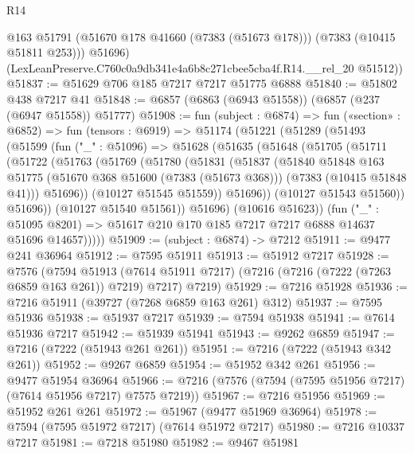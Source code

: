 \begin{lexlean}{R14}
\begin{coremodule}
          @163
          @51791
          (@51670 @178 @41660 (@7383 (@51673 @178)))
          (@7383 (@10415 @51811 @253)))
        @51696)
      (LexLeanPreserve.C760c0a9db341e4a6b8c271cbee5cba4f.R14.__rel_20 @51512))
@51837 := @51629 @706 @185 @7217 @7217 @51775 @6888
@51840 := @51802 @438 @7217 @41
@51848 := @6857 (@6863 (@6943 @51558)) (@6857 (@237 (@6947 @51558)) @51777)
@51908 := fun (subject : @6874) =>
  fun («section» : @6852) =>
  fun (tensors : @6919) =>
  @51174
    (@51221
      (@51289
        (@51493
          (@51599
            (fun ("_" : @51096) =>
            @51628
              (@51635
                (@51648
                  (@51705
                    (@51711
                      (@51722
                        (@51763
                          (@51769
                            (@51780
                              (@51831
                                (@51837
                                  (@51840
                                    @51848
                                    @163
                                    @51775
                                    (@51670 @368 @51600 (@7383 (@51673 @368)))
                                    (@7383 (@10415 @51848 @41)))
                                  @51696))
                              (@10127 @51545 @51559))
                            @51696))
                        (@10127 @51543 @51560))
                      @51696))
                  (@10127 @51540 @51561))
                @51696)
              (@10616 @51623))
            (fun ("_" : @51095 @8201) =>
            @51617 @210 @170 @185 @7217 @7217 @6888 @14637 @51696 @14657)))))
@51909 := (subject : @6874) -> @7212
@51911 := @9477 @241 @36964
@51912 := @7595 @51911
@51913 := @51912 @7217
@51928 := @7576
    (@7594
      @51913
      (@7614 @51911 @7217)
      (@7216 (@7216 (@7222 (@7263 @6859 @163 @261)) @7219) @7217)
      @7219)
@51929 := @7216 @51928
@51936 := @7216 @51911 (@39727 (@7268 @6859 @163 @261) @312)
@51937 := @7595 @51936
@51938 := @51937 @7217
@51939 := @7594 @51938
@51941 := @7614 @51936 @7217
@51942 := @51939 @51941
@51943 := @9262 @6859
@51947 := @7216 (@7222 (@51943 @261 @261))
@51951 := @7216 (@7222 (@51943 @342 @261))
@51952 := @9267 @6859
@51954 := @51952 @342 @261
@51956 := @9477 @51954 @36964
@51966 := @7216 (@7576 (@7594 (@7595 @51956 @7217) (@7614 @51956 @7217) @7575 @7219))
@51967 := @7216 @51956
@51969 := @51952 @261 @261
@51972 := @51967 (@9477 @51969 @36964)
@51978 := @7594 (@7595 @51972 @7217) (@7614 @51972 @7217)
@51980 := @7216 @10337 @7217
@51981 := @7218 @51980
@51982 := @9467 @51981

\end{coremodule}
\end{lexlean}
